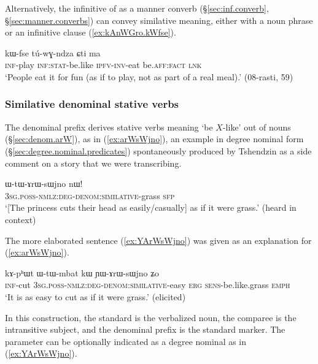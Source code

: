 Alternatively, the infinitive  of  as a manner converb (§\ref{sec:inf.converb}, §\ref{sec:manner.converbs}) can convey similative meaning, either with a noun phrase or an infinitive clause (\ref{ex:kAnWGro.kWfse}).

\begin{exe}
\ex \label{ex:kAnWGro.kWfse}
\gll [kɤ-ɤnɯɣro] kɯ-fse tú-wɣ-ndza ɕti ma \\
\textsc{inf}-play \textsc{inf}:\textsc{stat}-be.like \textsc{ipfv}-\textsc{inv}-eat be.\textsc{aff}:\textsc{fact} \textsc{lnk} \\
\glt `People eat it for fun (as if to play, not as part of a real meal).' (08-rasti, 59)
\end{exe}


\subsubsection{Similative denominal stative verbs} \label{sec:denominal:similative}
The denominal prefix  derives stative verbs meaning `be $X$-like' out of nouns (§\ref{sec:denom.arW}), as in (\ref{ex:arWsWjno}), an example in degree nominal form (§\ref{sec:degree.nominal.predicates}) spontaneously produced by Tshendzin as a side comment on a story that we were transcribing.

\begin{exe}
	\ex \label{ex:arWsWjno}
	\gll  ɯ-tɯ-ɤrɯ-sɯjno nɯ!   \\
	\textsc{3sg}.\textsc{poss}-\textsc{nmlz}:\textsc{deg}-\textsc{denom}:\textsc{similative}-grass \textsc{sfp} \\
	\glt `[The princess cuts their head as easily/casually] as if it were grass.' (heard in context)
\end{exe}

The more elaborated sentence (\ref{ex:YArWsWjno}) was given as an explanation for (\ref{ex:arWsWjno}).

\begin{exe}
	\ex \label{ex:YArWsWjno}
	\gll  kɤ-pʰɯt ɯ-tɯ-mbat kɯ ɲɯ-ɤrɯ-sɯjno ʑo \\
	\textsc{inf}-cut  \textsc{3sg}.\textsc{poss}-\textsc{nmlz}:\textsc{deg}-\textsc{denom}:\textsc{similative}-easy \textsc{erg} \textsc{sens}-be.like.grass \textsc{emph} \\
	\glt `It is as easy to cut as if it were grass.' (elicited)
\end{exe}

In this construction, the standard is the verbalized noun, the comparee is the intransitive subject, and the denominal prefix  is the standard marker. The parameter can be optionally indicated as a degree nominal as in (\ref{ex:YArWsWjno}).

